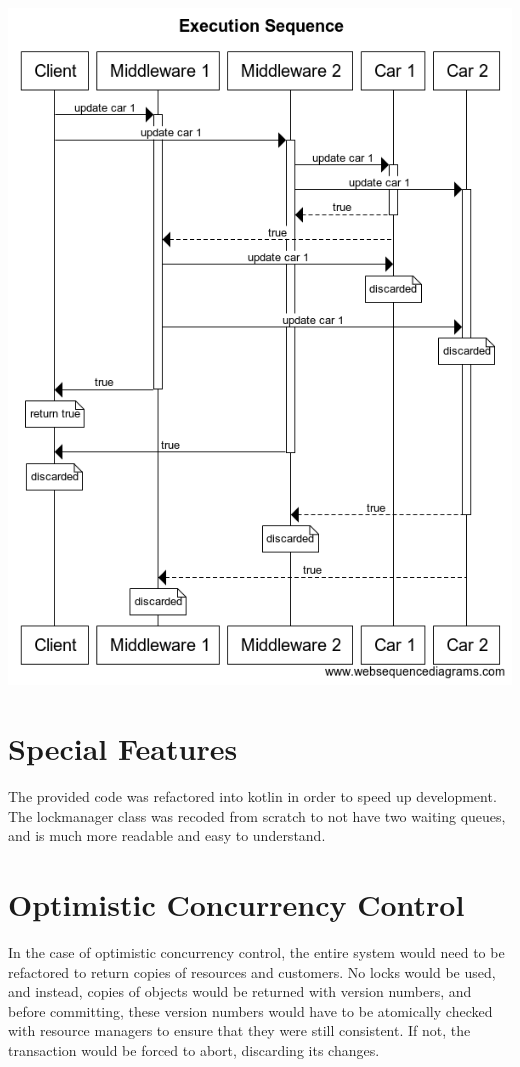 \documentclass[letterpaper,12pt]{article}
\begin{document}
	\begin{center} \includegraphics[width=0.8\columnwidth]{Execution_Sequence.png}
	\end{center}

	\pagebreak

	\section{Special Features}

	The provided code was refactored into kotlin in order to speed up development. The lockmanager class was recoded from scratch to not have two waiting queues, and is much more readable and easy to understand.

	\section{Optimistic Concurrency Control}

	In the case of optimistic concurrency control, the entire system would need to be refactored to return copies of resources and customers. No locks would be used, and instead, copies of objects would be returned with version numbers, and before committing, these version numbers would have to be atomically checked with resource managers to ensure that they were still consistent. If not, the transaction would be forced to abort, discarding its changes. 
\end{document}
